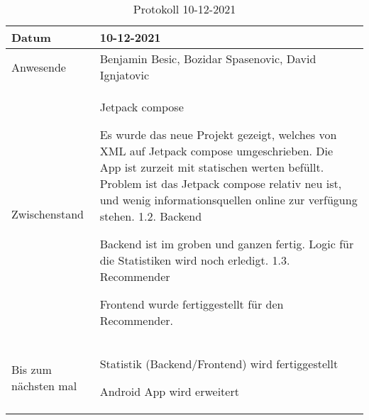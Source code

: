 \begin{table}
    \begin{tabular}{ |p{3cm}|p{10cm}|  }
        \hline
        Datum & 10-12-2021\\
        \hline
        Anwesende & Benjamin Besic, Bozidar Spasenovic, David Ignjatovic\\

        \hline
        Zwischenstand&  Jetpack compose

        Es wurde das neue Projekt gezeigt, welches von XML auf Jetpack compose umgeschrieben.
        Die App ist zurzeit mit statischen werten befüllt.
        Problem ist das Jetpack compose relativ neu ist, und wenig informationsquellen online zur verfügung stehen.
        1.2. Backend
        
        Backend ist im groben und ganzen fertig. Logic für die Statistiken wird noch erledigt.
        1.3. Recommender
        
        Frontend wurde fertiggestellt für den Recommender.
        \\
        \hline
        Bis zum nächsten mal &  



        Statistik (Backend/Frontend) wird fertiggestellt

        Android App wird erweitert
    
    
    
    \\
        \hline
    \end{tabular}
    \caption{Protokoll 10-12-2021}
    \label{tab:my_label}
\end{table}

